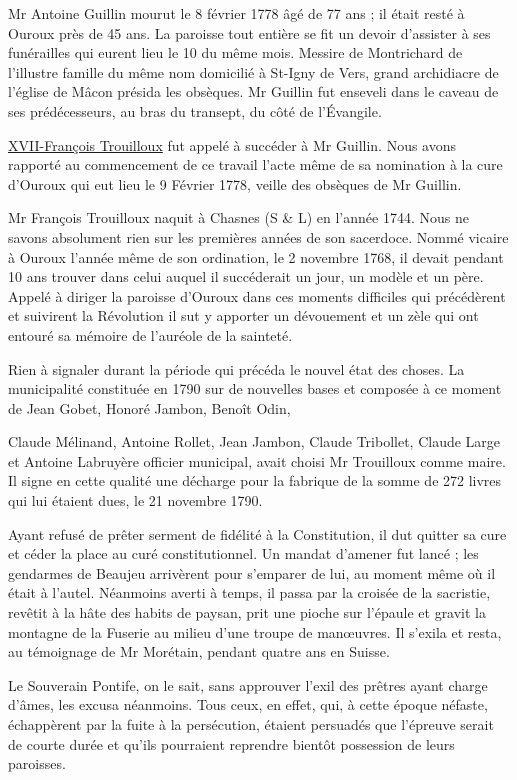 Mr Antoine Guillin mourut le 8 février 1778 âgé de 77 ans ; il était resté à Ouroux près de 45 ans. La paroisse tout entière se fit un devoir d'assister à ses funérailles qui eurent lieu le 10 du même mois. Messire de Montrichard de l'illustre famille du même nom domicilié à St-Igny de Vers, grand archidiacre de l'église de Mâcon présida les obsèques. Mr Guillin fut enseveli dans le caveau de ses prédécesseurs, au bras du transept, du côté de l'Évangile.

\underline{XVII-François Trouilloux} fut appelé à succéder à Mr Guillin. Nous avons rapporté au commencement de ce travail l'acte même de sa nomination à la cure d'Ouroux qui eut lieu le 9 Février 1778, veille des obsèques de Mr Guillin.

Mr François Trouilloux naquit à Chasnes (S \& L) en l'année 1744. Nous ne savons absolument rien sur les premières années de son sacerdoce. Nommé vicaire à Ouroux l'année même de son ordination, le 2 novembre 1768, il devait pendant 10 ans trouver dans celui auquel il succéderait un jour, un modèle et un père. Appelé à diriger la paroisse d'Ouroux dans ces moments difficiles qui précédèrent et suivirent la Révolution il sut y apporter un dévouement et un zèle qui ont entouré sa mémoire de l'auréole de la sainteté.

Rien à signaler durant la période qui précéda le nouvel état des choses. La municipalité constituée en 1790 sur de nouvelles bases et composée à ce moment de Jean Gobet, Honoré Jambon, Benoît Odin,

Claude Mélinand, Antoine Rollet, Jean Jambon, Claude Tribollet, Claude Large et Antoine Labruyère officier municipal, avait choisi Mr Trouilloux comme maire. Il signe en cette qualité une décharge pour la fabrique de la somme de 272 livres qui lui étaient dues, le 21 novembre 1790.

Ayant refusé de prêter serment de fidélité à la Constitution, il dut quitter sa cure et céder la place au curé constitutionnel. Un mandat d'amener fut lancé ; les gendarmes de Beaujeu arrivèrent pour s'emparer de lui, au moment même où il était à l'autel. Néanmoins averti à temps, il passa par la croisée de la sacristie, revêtit à la hâte des habits de paysan, prit une pioche sur l'épaule et gravit la montagne de la Fuserie au milieu d'une troupe de manœuvres. Il s'exila et resta, au témoignage de Mr Morétain, pendant quatre ans en Suisse.

Le Souverain Pontife, on le sait, sans approuver l'exil des prêtres ayant charge d'âmes, les excusa néanmoins. Tous ceux, en effet, qui, à cette époque néfaste, échappèrent par la fuite à la persécution, étaient persuadés que l'épreuve serait de courte durée et qu'ils pourraient reprendre bientôt possession de leurs paroisses.

